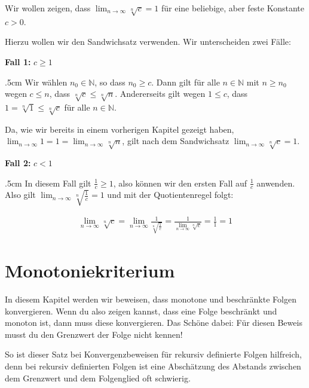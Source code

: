 \documentclass[fontsize=9pt,
               parskip=half-,
               DIV=14,
               listof=chapterentry,
               tocflat]{scrbook}
\newenvironment{indentblock}{\begin{adjustwidth}{.5cm}{}}{\end{adjustwidth}}
\newcommand{\proofcase}[2]{\textbf{\textcolor{sblau}{Fall #1:}} #2}
\begin{document}
\begin{example*}
Wir wollen zeigen, dass $\lim _{n\to \infty }{\sqrt[{n}]{c}}=1$ für eine beliebige, aber feste Konstante $c>0$.

Hierzu wollen wir den Sandwichsatz verwenden. Wir unterscheiden zwei Fälle:

\proofcase{1}{$c\geq 1$}
\begin{indentblock}
Wir wählen $n_{0}\in \mathbb {N} $, so dass $n_{0}\geq c$. Dann gilt für alle $n\in \mathbb {N} $ mit $n\geq n_{0}$ wegen $c\leq n$, dass ${\sqrt[{n}]{c}}\leq {\sqrt[{n}]{n}}$. Andererseits gilt wegen $1\leq c$, dass $1={\sqrt[{n}]{1}}\leq {\sqrt[{n}]{c}}$ für alle $n\in \mathbb {N} $.

Da, wie wir bereits in einem vorherigen Kapitel gezeigt haben, $\lim _{n\to \infty }1=1=\lim _{n\to \infty }{\sqrt[{n}]{n}}$, gilt nach dem Sandwichsatz $\lim _{n\to \infty }{\sqrt[{n}]{c}}=1$.

\end{indentblock}

\proofcase{2}{$c<1$}
\begin{indentblock}
In diesem Fall gilt ${\tfrac {1}{c}}\geq 1$, also können wir den ersten Fall auf ${\tfrac {1}{c}}$ anwenden. Also gilt $\lim _{n\to \infty }{\sqrt[{n}]{\tfrac {1}{c}}}=1$ und mit der Quotientenregel folgt:

\begin{align*}
\lim _{n\to \infty }{\sqrt[{n}]{c}}=\lim _{n\to \infty }{\frac {1}{\sqrt[{n}]{\frac {1}{c}}}}={\frac {1}{\lim _{n\to \infty }{\sqrt[{n}]{c}}}}={\frac {1}{1}}=1
\end{align*}

\end{indentblock}

\end{example*}

\chapter{Monotoniekriterium}

In diesem Kapitel werden wir beweisen, dass monotone und beschränkte Folgen konvergieren. Wenn du also zeigen kannst, dass eine Folge beschränkt und monoton ist, dann muss diese konvergieren. Das Schöne dabei: Für diesen Beweis musst du den Grenzwert der Folge nicht kennen!

So ist dieser Satz bei Konvergenzbeweisen für rekursiv definierte Folgen hilfreich, denn bei rekursiv definierten Folgen ist eine Abschätzung des Abstands zwischen dem Grenzwert und dem Folgenglied oft schwierig.
\end{document}
